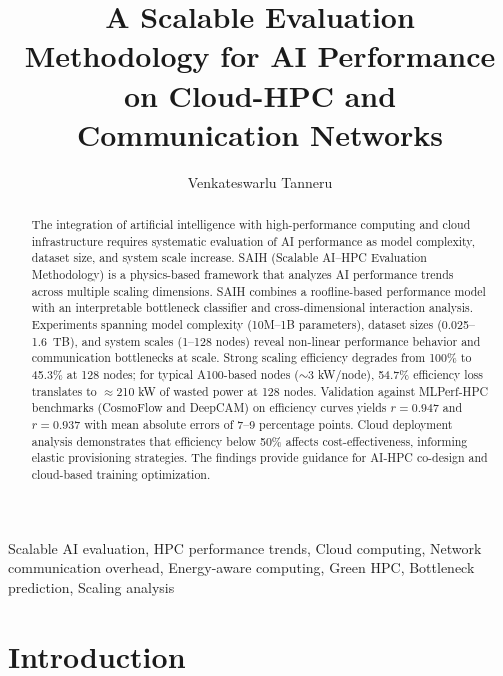 \documentclass{llncs}
\begin{document}
\title{A Scalable Evaluation Methodology for AI Performance on Cloud-HPC and Communication Networks}

\author{Venkateswarlu Tanneru}



\begin{abstract}
The integration of artificial intelligence with high-performance computing and cloud infrastructure requires systematic evaluation of AI performance as model complexity, dataset size, and system scale increase. SAIH (Scalable AI--HPC Evaluation Methodology) is a physics-based framework that analyzes AI performance trends across multiple scaling dimensions. SAIH combines a roofline-based performance model with an interpretable bottleneck classifier and cross-dimensional interaction analysis. Experiments spanning model complexity (10M--1B parameters), dataset sizes (0.025--1.6~TB), and system scales (1--128 nodes) reveal non-linear performance behavior and communication bottlenecks at scale. Strong scaling efficiency degrades from 100\% to 45.3\% at 128 nodes; for typical A100-based nodes ($\sim$3 kW/node), 54.7\% efficiency loss translates to $\approx$210 kW of wasted power at 128 nodes. Validation against MLPerf-HPC benchmarks (CosmoFlow and DeepCAM) on efficiency curves yields $r=0.947$ and $r=0.937$ with mean absolute errors of 7--9 percentage points. Cloud deployment analysis demonstrates that efficiency below 50\% affects cost-effectiveness, informing elastic provisioning strategies. The findings provide guidance for AI-HPC co-design and cloud-based training optimization.
\end{abstract}

\begin{keywords}
Scalable AI evaluation, HPC performance trends, Cloud computing, Network communication overhead, Energy-aware computing, Green HPC, Bottleneck prediction, Scaling analysis
\end{keywords}

\maketitle

\section{Introduction}
\end{document}
